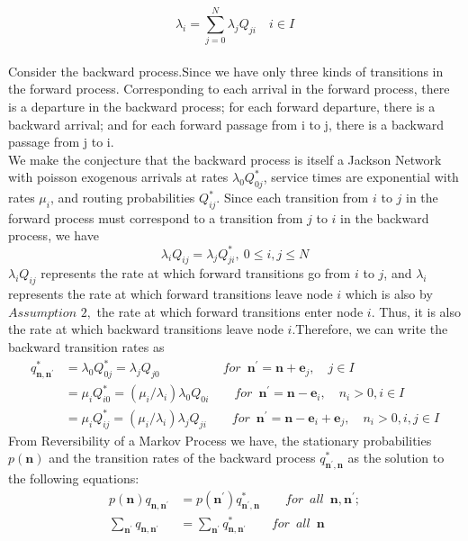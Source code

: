 \documentclass[a4paper,12pt]{scrartcl}
\begin{document}
\begin{equation}
\lambda_i = \sum_{j=0}^{N} \lambda_j Q_{ji} \quad i \in I
\end{equation}\\
Consider the backward process.Since we have only three kinds of transitions in the forward process. Corresponding to each arrival in the forward process, there is a departure in the backward process; for each forward departure, there is a backward arrival; and for each forward passage from i to j, there is a backward passage from j to i.\\
We make the conjecture that the backward process is itself a Jackson Network with poisson exogenous arrivals at rates $\lambda_0 Q_{0j}^{*}$, service times are exponential with rates   $\mu_i$, and routing probabilities $Q_{ij}^*$. Since each transition from $i$ to $j$ in the forward process must correspond to a transition from $j$ to $i$ in the backward process, we have
\begin{equation}
\lambda_i Q_{ij} = \lambda_j Q_{ji}^* ,~ 0 \leq i,j \leq N
\end{equation}
$\lambda_i Q_{ij}$ represents the rate at which forward transitions go from $i$ to $j$, and $\lambda_i$ represents the rate at which forward transitions leave node $i$ which is also by $\textit{Assumption 2},$ the rate at which forward transitions enter node $i$. Thus, it is also the rate at which backward transitions leave node $i$.Therefore, we can write the backward transition rates as
\begin{align}
q_{\textbf{n},\textbf{n}^{\prime}}^*&=\lambda_0Q_{0j}^*=\lambda_jQ_{j0}\quad\quad\quad\quad\quad for\enspace\textbf{n}^{\prime} = \textbf{n} + \textbf{e}_j,\quad j\in I\\
&=\mu_iQ_{i0}^*=(\mu_i/\lambda_i)\lambda_0Q_{0i} \quad\quad for\enspace\textbf{n}^{\prime} = \textbf{n} - \textbf{e}_i,\quad n_i > 0, i \in I\\
&=\mu_iQ_{ij}^*=(\mu_i/\lambda_i)\lambda_jQ_{ji} \quad\quad for\enspace\textbf{n}^{\prime} = \textbf{n} - \textbf{e}_i + \textbf{e}_j,\quad n_i > 0, i,j \in I
\end{align}
From Reversibility of a Markov Process we have, the stationary probabilities $p(\textbf{n})$ and the transition rates of  the backward process $q_{\textbf{n}^{\prime},\textbf{n}}^*$ as the solution to the following equations:
\begin{align*}
p(\textbf{n})q_{\textbf{n},\textbf{n}^{\prime}}&=p(\textbf{n}^{\prime})q_{\textbf{n}^{\prime},\textbf{n}}^*\qquad for\enspace all \enspace \textbf{n},\textbf{n}^{\prime};\\
\sum_{\textbf{n}^{\prime}}q_{\textbf{n},\textbf{n}^{\prime}}&=\sum_{\textbf{n}^{\prime}}q_{\textbf{n},\textbf{n}^{\prime}}^*\qquad for\enspace all \enspace \textbf{n}
\end{align*}
\end{document}
